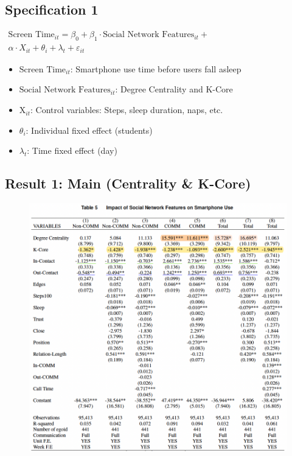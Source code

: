 \documentclass[
  letterpaper,
  DIV=11,
  numbers=noendperiod]{scrartcl}
\providecommand{\tightlist}{%
  \setlength{\itemsep}{0pt}\setlength{\parskip}{0pt}}\usepackage{longtable,booktabs,array}
\begin{document}
\hypertarget{specification-1}{%
\subsection{Specification 1}\label{specification-1}}

\hfill\break

\(\begin{equation} \begin{split} \text{Screen Time}_{it} = \beta_0 + \beta_1 \cdot \text{Social Network Features}_{it} + \\ \alpha \cdot X_{it} + \theta_i + \lambda_t + \varepsilon_{it} \end{split} \label{e1}\end{equation}\)\\

\begin{itemize}
\tightlist
\item
  \(\text{Screen Time}_{it}\): Smartphone use time before users fall
  asleep
\item
  \(\text{Social Network Features}_{it}\): Degree Centrality and K-Core
\item
  \(\text{X}_{it}\): Control variables: Steps, sleep duration, naps,
  etc.
\item
  \(\theta_i\): Individual fixed effect (students)
\item
  \(\lambda_t\): Time fixed effect (day)
\end{itemize}

\hypertarget{result-1-main-centrality-k-core}{%
\subsection{Result 1: Main (Centrality \&
K-Core)}\label{result-1-main-centrality-k-core}}

\begin{figure}

{\centering \includegraphics{images/2table5.png}

}

\end{figure}
\end{document}
